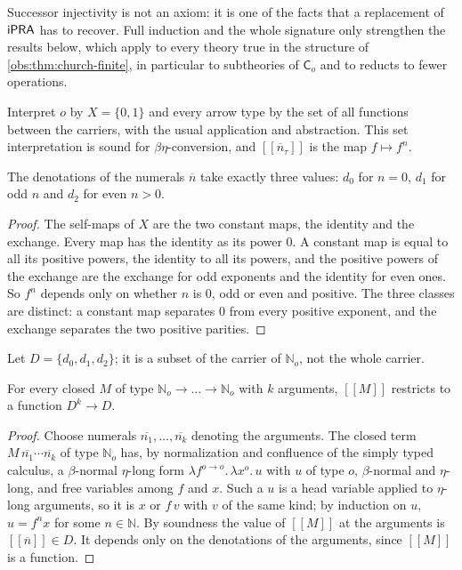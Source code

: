 Successor injectivity is not an axiom: it is one of the facts that a
replacement of $\mathsf{iPRA}$ has to recover. Full induction and the whole signature
only strengthen the results below, which apply to every theory true in the
structure of \cref{obs:thm:church-finite}, in particular to subtheories of
$\mathsf{C}_o$ and to reducts to fewer operations.

Interpret $o$ by $X=\{0,1\}$ and every arrow type by the set of all functions
between the carriers, with the usual application and abstraction. This set
interpretation is sound for $\beta\eta$-conversion, and
$[\![\overline{n}_\tau]\!]$ is the map $f\mapsto f^{n}$.

\begin{lemma}
\label{obs:lem:church-three}
The denotations of the numerals $\overline{n}$ take exactly three values:
$d_0$ for $n=0$, $d_1$ for odd $n$ and $d_2$ for even $n>0$.
\end{lemma}

\begin{proof}
The self-maps of $X$ are the two constant maps, the identity and the
exchange. Every map has the identity as its power $0$. A constant map is
equal to all its positive powers, the identity to all its powers, and the
positive powers of the exchange are the exchange for odd exponents and the
identity for even ones. So $f^{n}$ depends only on whether $n$ is $0$, odd or
even and positive. The three classes are distinct: a constant map separates
$0$ from every positive exponent, and the exchange separates the two positive
parities.
\end{proof}

Let $D=\{d_0,d_1,d_2\}$; it is a subset of the carrier of $\mathbb{N}_o$, not
the whole carrier.

\begin{lemma}
\label{obs:lem:church-closure}
For every closed $M$ of type $\mathbb{N}_o\to\dots\to\mathbb{N}_o$ with $k$
arguments, $[\![M]\!]$ restricts to a function $D^{k}\to D$.
\end{lemma}

\begin{proof}
Choose numerals $\overline{n_1},\dots,\overline{n_k}$ denoting the arguments.
The closed term $M\,\overline{n_1}\cdots\overline{n_k}$ of type $\mathbb{N}_o$
has, by normalization and confluence of the simply typed calculus, a
$\beta$-normal $\eta$-long form $\lambda f^{o\to o}.\,\lambda x^{o}.\,u$ with $u$
of type $o$, $\beta$-normal and $\eta$-long, and free variables among $f$ and
$x$. Such a $u$ is a head variable applied to $\eta$-long arguments, so it is
$x$ or $f\,v$ with $v$ of the same kind; by induction on $u$, $u=f^{n}x$ for some
$n\in\mathbb{N}$. By soundness the value of $[\![M]\!]$ at the arguments is
$[\![\overline{n}]\!]\in D$. It depends only on the denotations of the
arguments, since $[\![M]\!]$ is a function.
\end{proof}

